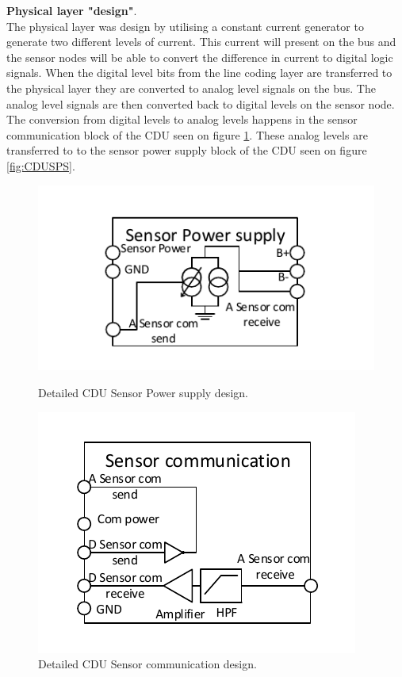 \textbf{Physical layer "design"}.\\
The physical layer was design by utilising a constant current generator to generate two different levels of current. This current will present on the bus and the sensor nodes will be able to convert the difference in current to digital logic signals. When the digital level bits from the line coding layer are transferred to the physical layer they are converted to analog level signals on the bus. The analog level signals are then converted back to digital levels on the sensor node. The conversion from digital levels to analog levels happens in the sensor communication block of the CDU seen on figure \ref{fig:CDUSC}. These analog levels are transferred to to the sensor power supply block of the CDU seen on figure \ref{fig:CDUSPS}. 
\begin{figure}[H]
	\begin{minipage}[b]{0.45\linewidth}
	\centering
	\includegraphics[scale=1]{billeder/11ProjectDescription/CDUSPS}
	\caption{Detailed CDU Sensor Power supply design.}
	\label{fig:CDUSPS}
	\end{minipage}
	\hspace{0.5cm}
	\begin{minipage}[b]{0.45\linewidth}
	\centering
	\includegraphics[scale=1]{billeder/11ProjectDescription/CDUSC}
	\caption{Detailed CDU Sensor communication design.}
	\label{fig:CDUSC}
	\end{minipage}
\end{figure}

